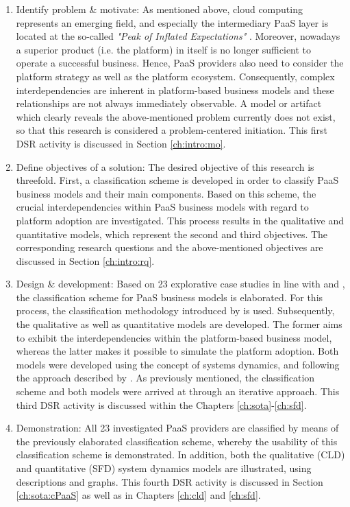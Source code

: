 \begin{enumerate}
	\item Identify problem \& motivate: As mentioned above, cloud computing represents an emerging field, and especially the intermediary \ac{PaaS} layer is located at the so-called \textit{"Peak of Inflated Expectations"} \citep[p. 5]{Smith2012}. Moreover, nowadays a superior product (i.e. the platform) in itself is no longer sufficient to operate a successful business. Hence, \ac{PaaS} providers also need to consider the platform strategy as well as the platform ecosystem. Consequently, complex interdependencies are inherent in platform-based business models and these relationships are not always immediately observable. A model or artifact which clearly reveals the above-mentioned problem currently does not exist, so that this research is considered a problem-centered initiation. This first \ac{DSR} activity is discussed in Section \ref{ch:intro:mo}.
	\item Define objectives of a solution: The desired objective of this research is threefold. First, a classification scheme is developed in order to classify \ac{PaaS} business models and their main components. Based on this scheme, the crucial interdependencies within \ac{PaaS} business models with regard to platform adoption are investigated. This process results in the qualitative and quantitative models, which represent the second and third objectives. The corresponding research questions and the above-mentioned objectives are discussed in Section \ref{ch:intro:rq}.
	\item Design \& development: Based on 23 explorative case studies in line with \citet{Eisenhardt1989} and \citet{Yin2008}, the classification scheme for \ac{PaaS} business models is elaborated. For this process, the classification methodology introduced by \citet{Fettke2003} is used. Subsequently, the qualitative as well as quantitative models are developed. The former aims to exhibit the interdependencies within the platform-based business model, whereas the latter makes it possible to simulate the platform adoption. Both models were developed using the concept of systems dynamics, and following the approach described by \citet{Sterman2000,Sterman2001}. As previously mentioned, the classification scheme and both models were arrived at through an iterative approach. This third \ac{DSR} activity is discussed within the Chapters \ref{ch:sota}-\ref{ch:sfd}.
	\item Demonstration: All 23 investigated \ac{PaaS} providers are classified by means of the previously elaborated classification scheme, whereby the usability of this classification scheme is demonstrated. In addition, both the qualitative (\ac{CLD}) and quantitative (\ac{SFD}) system dynamics models are illustrated, using descriptions and graphs. This fourth \ac{DSR} activity is discussed in Section \ref{ch:sota:cPaaS} as well as in Chapters \ref{ch:cld} and \ref{ch:sfd}.

\end{enumerate}
